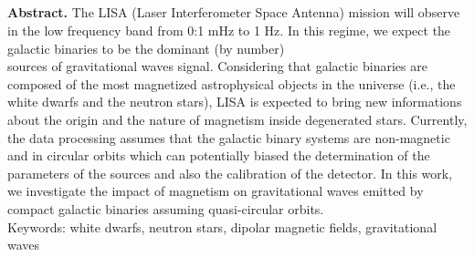 \documentclass[a4paper,10.5pt]{article}
\author{nadiarosaleso }
\date{November 2022}
\begin{document}
\begin{center}
    \textbf{\\\vspace{2cm}\Large{}}
\end{center}

\\\vspace{0.4cm}\\

{\large{}}\\\vspace{-8cm}

{\small{\textbf{Abstract.} The LISA (Laser Interferometer Space Antenna) mission will observe in the low frequency band from 0:1 mHz to 1 Hz. In this regime, we expect the galactic binaries to be the dominant (by number)}\\ sources of gravitational waves signal. Considering that galactic binaries are composed of the most magnetized astrophysical objects in the universe (i.e., the white dwarfs and the neutron stars), LISA is expected to bring new informations about the origin and the nature of magnetism inside degenerated stars. Currently, the data processing assumes that the galactic binary systems are non-magnetic and in circular orbits which can potentially biased the determination of the parameters of the sources and also the calibration of the detector. In this work, we investigate the impact of magnetism on gravitational waves emitted by compact galactic binaries assuming quasi-circular orbits.\\\vspace{1mm}
Keywords: white dwarfs, neutron stars, dipolar magnetic fields, gravitational waves}
\end{document}
